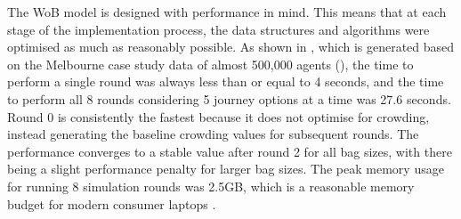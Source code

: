 The WoB model is designed with performance in mind. This means that at each stage of the implementation process, the data structures and algorithms were optimised as much as reasonably possible. As shown in , which is generated based on the Melbourne case study data of almost 500,000 agents (), the time to perform a single round was always less than or equal to 4 seconds, and the time to perform all 8 rounds considering 5 journey options at a time was 27.6 seconds. Round 0 is consistently the fastest because it does not optimise for crowding, instead generating the baseline crowding values for subsequent rounds. The performance converges to a stable value after round 2 for all bag sizes, with there being a slight performance penalty for larger bag sizes. The peak memory usage for running 8 simulation rounds was 2.5GB, which is a reasonable memory budget for modern consumer laptops \cite{SpecificationsPersonalComputers}.

